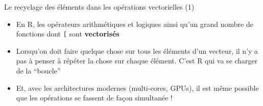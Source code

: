 \documentclass[
  ignorenonframetext,
]{beamer}
\providecommand{\tightlist}{%
  \setlength{\itemsep}{0pt}\setlength{\parskip}{0pt}}
\begin{document}
\begin{frame}[fragile]{Le recyclage des éléments dans les opérations
vectorielles (1)}
\protect\hypertarget{le-recyclage-des-uxe9luxe9ments-dans-les-opuxe9rations-vectorielles-1}{}
\begin{itemize}
\tightlist
\item
  En R, les opérateurs arithmétiques et logiques ainsi qu'un grand
  nombre de fonctions dont \texttt{{[}} sont \textbf{vectorisés}
\item
  Lorsqu'on doit faire quelque chose sur tous les éléments d'un vecteur,
  il n'y a pas à penser à répéter la chose sur chaque élément. C'est R
  qui va se charger de la ``boucle''
\item
  Et, avec les architectures modernes (multi-cores, GPUs), il est même
  possible que les opérations se fassent de façon simultanée !
\end{itemize}
\end{frame}
\end{document}
